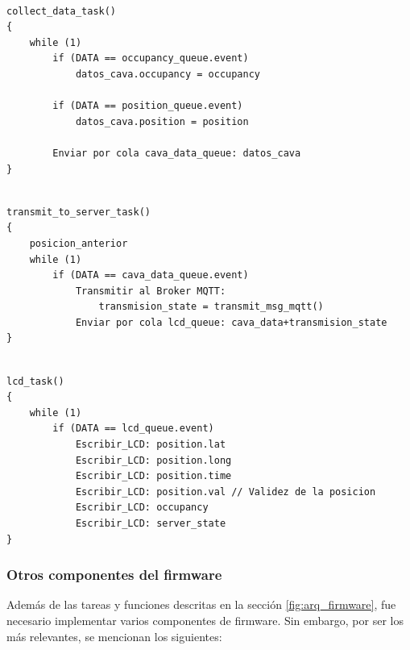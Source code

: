 \begin{lstlisting}[label=cod:collect_data_task, caption=Pseudocódigo de la función collect\_data\_task().] 

collect_data_task()
{
	while (1)
		if (DATA == occupancy_queue.event)
			datos_cava.occupancy = occupancy
			
		if (DATA == position_queue.event)
			datos_cava.position = position
		
		Enviar por cola cava_data_queue: datos_cava		
}

\end{lstlisting}

 

\begin{lstlisting}[label=cod:transmit_to_server_task, caption=Pseudocódigo de la función transmit\_to\_server\_task().] 

transmit_to_server_task()
{
	posicion_anterior
	while (1)
		if (DATA == cava_data_queue.event)
			Transmitir al Broker MQTT: 
				transmision_state = transmit_msg_mqtt()
			Enviar por cola lcd_queue: cava_data+transmision_state
}

\end{lstlisting}

 

\begin{lstlisting}[label=cod:lcd_task, caption=Pseudocódigo de la función lcd\_task().] 

lcd_task()
{
	while (1)
		if (DATA == lcd_queue.event)
			Escribir_LCD: position.lat
			Escribir_LCD: position.long
			Escribir_LCD: position.time
			Escribir_LCD: position.val // Validez de la posicion
			Escribir_LCD: occupancy
			Escribir_LCD: server_state
}

\end{lstlisting}



\subsubsection{Otros componentes del firmware}

Además de las tareas y funciones descritas en la sección \ref{fig:arq_firmware}, fue necesario implementar varios componentes de firmware. Sin embargo, por ser los más relevantes, se mencionan los siguientes:

